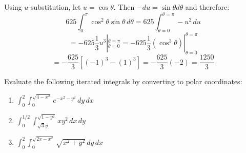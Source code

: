 Using $u$-substitution, let $u = \cos{\theta}$. Then $-du = \sin{\theta} d
\theta$ and therefore:
$$625 \int_0^{\pi} \cos^2{\theta}\sin{\theta}\,d\theta = 625 \int_{\theta = 0}^
{\theta = \pi} -u^2\,du$$
$$= -625 \frac{1}{3}u^3|_{\theta = 0}^{\theta = \pi} = -625 \frac{1}{3} \left( 
\cos^3{\theta} \right)|_{\theta = 0}^{\theta = \pi}$$
$$= -\frac{625}{3} \left[ (-1)^3 - (1)^3 \right] = -\frac{625}{3} \left(-2 
\right) = \frac{1250}{3}$$

\begin{Exercise}[title = {Changing to Polar Coordinates}, label = polarmulti3]
Evaluate the following iterated integrals by converting to polar coordinates:
\begin{enumerate}
    \item $\int_0^2 \int_0^{\sqrt{4 - x^2}} e^{-x^2 - y^2}\,dy\,dx$
    \item $\int_0^{1/2} \int_{\sqrt{3}y}^{\sqrt{1 - y^2}} xy^2\,dx\,dy$
    \item $\int_0^2 \int_0^{\sqrt{2x - x^2}} \sqrt{x^2 + y^2}\,dy\,dx$
\end{enumerate}
\vspace{130mm}
\end{Exercise}

